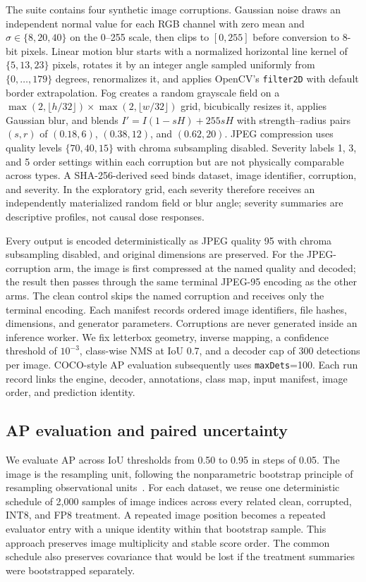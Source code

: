 \documentclass[a4paper,fleqn]{cas-dc}
\begin{document}
The suite contains four synthetic image corruptions. Gaussian noise draws an independent normal value for each RGB channel with zero mean and $\sigma\in\{8,20,40\}$ on the 0--255 scale, then clips to $[0,255]$ before conversion to 8-bit pixels. Linear motion blur starts with a normalized horizontal line kernel of $\{5,13,23\}$ pixels, rotates it by an integer angle sampled uniformly from $\{0,\ldots,179\}$ degrees, renormalizes it, and applies OpenCV's \texttt{filter2D} with default border extrapolation. Fog creates a random grayscale field on a $\max(2,\lfloor h/32\rfloor)\times\max(2,\lfloor w/32\rfloor)$ grid, bicubically resizes it, applies Gaussian blur, and blends $I'=I(1-sH)+255sH$ with strength--radius pairs $(s,r)$ of $(0.18,6)$, $(0.38,12)$, and $(0.62,20)$. JPEG compression uses quality levels $\{70,40,15\}$ with chroma subsampling disabled. Severity labels 1, 3, and 5 order settings within each corruption but are not physically comparable across types. A SHA-256-derived seed binds dataset, image identifier, corruption, and severity. In the exploratory grid, each severity therefore receives an independently materialized random field or blur angle; severity summaries are descriptive profiles, not causal dose responses.

Every output is encoded deterministically as JPEG quality 95 with chroma subsampling disabled, and original dimensions are preserved. For the JPEG-corruption arm, the image is first compressed at the named quality and decoded; the result then passes through the same terminal JPEG-95 encoding as the other arms. The clean control skips the named corruption and receives only the terminal encoding. Each manifest records ordered image identifiers, file hashes, dimensions, and generator parameters. Corruptions are never generated inside an inference worker. We fix letterbox geometry, inverse mapping, a confidence threshold of $10^{-3}$, class-wise NMS at IoU 0.7, and a decoder cap of 300 detections per image. COCO-style AP evaluation subsequently uses \texttt{maxDets}=100. Each run record links the engine, decoder, annotations, class map, input manifest, image order, and prediction identity.

\subsection{AP evaluation and paired uncertainty}
\label{sec:uncertainty}

We evaluate AP across IoU thresholds from 0.50 to 0.95 in steps of 0.05. The image is the resampling unit, following the nonparametric bootstrap principle of resampling observational units~\citep{efron1979bootstrap}. For each dataset, we reuse one deterministic schedule of 2,000 samples of image indices across every related clean, corrupted, INT8, and FP8 treatment. A repeated image position becomes a repeated evaluator entry with a unique identity within that bootstrap sample. This approach preserves image multiplicity and stable score order. The common schedule also preserves covariance that would be lost if the treatment summaries were bootstrapped separately.
\end{document}
